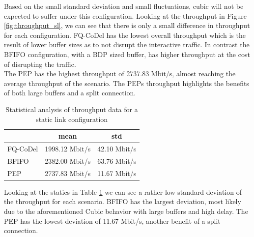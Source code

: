 \documentclass[a4paper,english, 12pt]{report}
\begin{document}
Based on the small standard deviation and small fluctuations, cubic will not be expected to suffer under this configuration. Looking at the throughput in Figure \ref{fig:throughput_sl}, we can see that there is only a small difference in throughput for each configuration. FQ-CoDel has the lowest overall throughput which is the result of lower buffer sizes as to not disrupt the interactive traffic. In contrast the BFIFO configuration, with a BDP sized buffer, has higher throughput at the cost of disrupting the traffic.\\

The PEP has the highest throughput of 2737.83 Mbit/s, almost reaching the average throughput of the scenario. The PEPs throughput highlights the benefits of both large buffers and a split connection.\\

\begin{table}[h!]
\centering
\begin{tabular}{l|c|c}
\hline
 & \textbf{mean} & \textbf{std} \\
\hline
FQ-CoDel & 1998.12 Mbit/s & 42.10 Mbit/s  \\
BFIFO    & 2382.00 Mbit/s & 63.76 Mbit/s  \\
PEP      & 2737.83 Mbit/s & 11.67 Mbit/s  \\
\hline
\end{tabular}
\caption{Statistical analysis of throughput data for a static link configuration}
\label{tab:throughput_sl_table}
\end{table}

Looking at the statics in Table \ref{tab:throughput_sl_table} we can see a rather low standard deviation of the throughput for each scenario. BFIFO has the largest deviation, most likely due to the aforementioned Cubic behavior with large buffers and high delay. The PEP has the lowest deviation of 11.67 Mbit/s, another benefit of a split connection.\\
\end{document}
